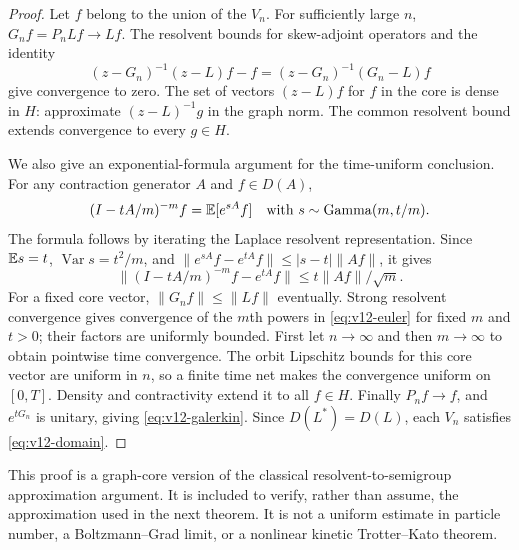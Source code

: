 \begin{proof}
Let $f$ belong to the union of the $V_n$. For sufficiently large $n$,
$G_nf=P_nLf\to Lf$. The resolvent bounds for skew-adjoint operators and
the identity
\[
 (z-G_n)^{-1}(z-L)f-f
       =(z-G_n)^{-1}(G_n-L)f
\]
give convergence to zero. The set of vectors $(z-L)f$ for $f$ in the
core is dense in $H$: approximate $(z-L)^{-1}g$ in the graph norm.
The common resolvent bound extends convergence to every $g\in H$.

We also give an exponential-formula argument for the time-uniform
conclusion. For any contraction generator $A$ and $f\in D(A)$,
\[
 (I-tA/m)^{-m}f=\mathbb E[e^{sA}f]\quad
 \text{with }s\sim\operatorname{Gamma}(m,t/m).
\]
The formula follows by iterating the Laplace resolvent representation.
Since $\mathbb E s=t$, $\operatorname{Var}s=t^2/m$, and
$\|e^{sA}f-e^{tA}f\|\le |s-t|\|Af\|$, it gives
\begin{equation}
 \|(I-tA/m)^{-m}f-e^{tA}f\|
       \le t\|Af\|/\sqrt m.
 \label{eq:v12-euler}
\end{equation}
For a fixed core vector, $\|G_nf\|\le\|Lf\|$ eventually.
Strong resolvent convergence gives convergence of the $m$th powers in
\eqref{eq:v12-euler} for fixed $m$ and $t>0$; their factors are uniformly
bounded. First let $n\to\infty$ and then $m\to\infty$ to obtain pointwise
time convergence. The orbit Lipschitz bounds for this core vector are
uniform in $n$, so a finite time net makes the convergence uniform on
$[0,T]$. Density and contractivity extend it to all $f\in H$.
Finally $P_nf\to f$, and $e^{tG_n}$ is unitary, giving
\eqref{eq:v12-galerkin}. Since $D(L^*)=D(L)$, each $V_n$ satisfies
\eqref{eq:v12-domain}.
\end{proof}

This proof is a graph-core version of the classical resolvent-to-semigroup
approximation argument. It is included to verify, rather than assume,
the approximation used in the next theorem. It is not a uniform estimate
in particle number, a Boltzmann--Grad limit, or a nonlinear kinetic
Trotter--Kato theorem.

